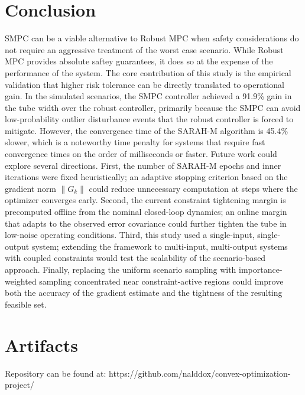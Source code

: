 \documentclass[11pt]{article}
\begin{document}
\section{Conclusion}
SMPC can be a viable alternative to Robust MPC when safety considerations do not require an aggressive treatment of the worst case scenario.
While Robust MPC provides absolute saftey guarantees, it does so at the expense of the performance of the system.
The core contribution of this study is the empirical validation that higher risk tolerance can be directly translated to operational gain.
In the simulated scenarios, the SMPC controller achieved a 91.9\% gain in the tube width over the robust controller, primarily because the SMPC can avoid low-probability outlier disturbance events that the robust controller is forced to mitigate.
However, the convergence time of the SARAH-M algorithm is 45.4\% slower, which is a noteworthy time penalty for systems that require fast convergence times on the order of milliseconds or faster.
Future work could explore several directions. First, the number of SARAH-M epochs and inner iterations were fixed heuristically; an adaptive stopping criterion based on the gradient norm $\|G_k\|$ could reduce unnecessary computation at steps where the optimizer converges early. Second, the current constraint tightening margin is precomputed offline from the nominal closed-loop dynamics; an online margin that adapts to the observed error covariance could further tighten the tube in low-noise operating conditions. Third, this study used a single-input, single-output system; extending the framework to multi-input, multi-output systems with coupled constraints would test the scalability of the scenario-based approach. Finally, replacing the uniform scenario sampling with importance-weighted sampling concentrated near constraint-active regions could improve both the accuracy of the gradient estimate and the tightness of the resulting feasible set.

\section{Artifacts}
Repository can be found at: https://github.com/nalddox/convex-optimization-project/



\end{document}
